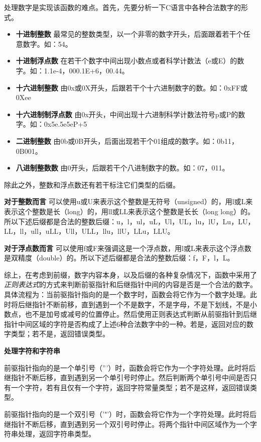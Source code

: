 \documentclass[twocolumn]{article}
\begin{document}
处理数字是实现该函数的难点。首先，先要分析一下C语言中各种合法数字的形式。
\begin{itemize}
	\item \textbf{十进制整数 }最常见的整数类型，以一个非零的数字开头，后面跟着若干个任意数字。如：54。
	\item \textbf{十进制浮点数 }在若干个数字中间出现小数点或者科学计数法（e或E）的数字。如：1.1e-4，000.1E+6，00.44。
	\item \textbf{十六进制整数 }由0x或0X开头，后跟若干个十六进制数字的数。如：0xFF或0Xee
	\item \textbf{十六进制制浮点数 }由0x开头，中间出现十六进制科学计数法符号p或P的数字。如：0x5e.5e5eP+5
	\item \textbf{二进制整数 }由0b或0B开头，后面出现若干个01组成的数字。如：0b11，0B001。
	\item \textbf{八进制整数数 }由0开头，后跟若干个八进制数字的数。如：07，011。
\end{itemize}

除此之外，整数和浮点数还有若干标注它们类型的后缀。

\textbf{对于整数而言 } 可以使用u或U来表示这个整数是无符号（unsigned）的，用l或L来表示这个整数是长（long）的，用ll或LL来表示这个整数是长长（long long）的。所以下述后缀都是合法的整数后缀：u，l，ul，uL，Ul，UL，lu，lU，Lu，LU，LL，ll，ull，uLL，Ull，ULL，llu，llU，LLu，LLU。

\textbf{对于浮点数而言 } 可以使用f或F来强调这是一个浮点数，用l或L来表示这个浮点数是双精度（double）的。所以下述后缀都是合法的整数后缀：f，F，l，L。

综上，在考虑到前缀，数字内容本身，以及后缀的各种复杂情况下，函数中采用了\textit{正则表达式}的方式来判断前驱指针和后继指针中间的内容是否是一个合法的数字。具体流程为：当前驱指针指向的是一个数字时，函数会将它作为一个数字处理。此时将后继指针不断前移，直到遇到一个不是数字，不是字母，不是下划线，不是小数点，也不是加号或减号的位置停止。然后使用正则表达式判断从前驱指针到后继指针中间区域的字符是否构成了上述6种合法数字中的一种。若是，返回对应的数字类型；若不是，返回错误类型。

\textbf{处理字符和字符串 }

前驱指针指向的是一个单引号（'''）时，函数会将它作为一个字符处理。此时将后继指针不断后移，直到遇到另一个单引号时停止。然后判断两个单引号中间是否只有一个字符，若有且仅有一个字符，返回字符常量类型；若不是这样，返回错误类型。

前驱指针指向的是一个双引号（'"'）时，函数会将它作为一个字符处理。此时将后继指针不断后移，直到遇到另一个双引号时停止。将两个指针中间区域作为一个字符串处理，返回字符串类型。
\end{document}
